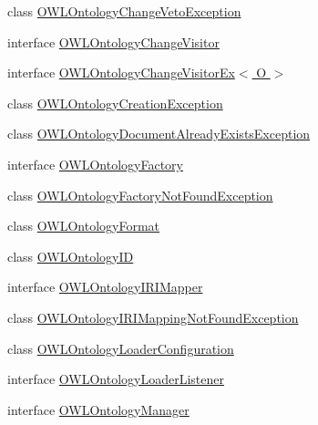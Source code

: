 \begin{DoxyCompactItemize}
class \hyperlink{classorg_1_1semanticweb_1_1owlapi_1_1model_1_1_o_w_l_ontology_change_veto_exception}{O\-W\-L\-Ontology\-Change\-Veto\-Exception}
\item 
interface \hyperlink{interfaceorg_1_1semanticweb_1_1owlapi_1_1model_1_1_o_w_l_ontology_change_visitor}{O\-W\-L\-Ontology\-Change\-Visitor}
\item 
interface \hyperlink{interfaceorg_1_1semanticweb_1_1owlapi_1_1model_1_1_o_w_l_ontology_change_visitor_ex_3_01_o_01_4}{O\-W\-L\-Ontology\-Change\-Visitor\-Ex$<$ O $>$}
\item 
class \hyperlink{classorg_1_1semanticweb_1_1owlapi_1_1model_1_1_o_w_l_ontology_creation_exception}{O\-W\-L\-Ontology\-Creation\-Exception}
\item 
class \hyperlink{classorg_1_1semanticweb_1_1owlapi_1_1model_1_1_o_w_l_ontology_document_already_exists_exception}{O\-W\-L\-Ontology\-Document\-Already\-Exists\-Exception}
\item 
interface \hyperlink{interfaceorg_1_1semanticweb_1_1owlapi_1_1model_1_1_o_w_l_ontology_factory}{O\-W\-L\-Ontology\-Factory}
\item 
class \hyperlink{classorg_1_1semanticweb_1_1owlapi_1_1model_1_1_o_w_l_ontology_factory_not_found_exception}{O\-W\-L\-Ontology\-Factory\-Not\-Found\-Exception}
\item 
class \hyperlink{classorg_1_1semanticweb_1_1owlapi_1_1model_1_1_o_w_l_ontology_format}{O\-W\-L\-Ontology\-Format}
\item 
class \hyperlink{classorg_1_1semanticweb_1_1owlapi_1_1model_1_1_o_w_l_ontology_i_d}{O\-W\-L\-Ontology\-I\-D}
\item 
interface \hyperlink{interfaceorg_1_1semanticweb_1_1owlapi_1_1model_1_1_o_w_l_ontology_i_r_i_mapper}{O\-W\-L\-Ontology\-I\-R\-I\-Mapper}
\item 
class \hyperlink{classorg_1_1semanticweb_1_1owlapi_1_1model_1_1_o_w_l_ontology_i_r_i_mapping_not_found_exception}{O\-W\-L\-Ontology\-I\-R\-I\-Mapping\-Not\-Found\-Exception}
\item 
class \hyperlink{classorg_1_1semanticweb_1_1owlapi_1_1model_1_1_o_w_l_ontology_loader_configuration}{O\-W\-L\-Ontology\-Loader\-Configuration}
\item 
interface \hyperlink{interfaceorg_1_1semanticweb_1_1owlapi_1_1model_1_1_o_w_l_ontology_loader_listener}{O\-W\-L\-Ontology\-Loader\-Listener}
\item 
interface \hyperlink{interfaceorg_1_1semanticweb_1_1owlapi_1_1model_1_1_o_w_l_ontology_manager}{O\-W\-L\-Ontology\-Manager}
\item 

\end{DoxyCompactItemize}
